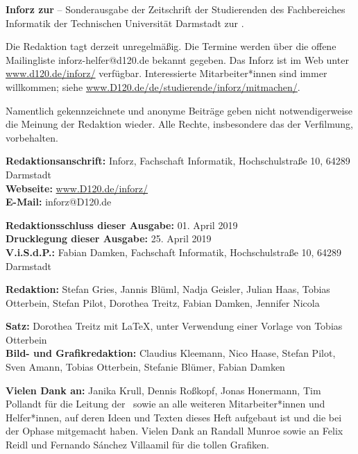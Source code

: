 \small

\textbf{Inforz zur \ophase} – Sonderausgabe der Zeitschrift der Studierenden des Fachbereiches Informatik der Technischen Universität Darmstadt zur \ophase.

\vspace{3mm}
Die Redaktion tagt derzeit unregelmäßig. Die Termine werden über die offene Mailingliste inforz-helfer@d120.de bekannt gegeben. Das Inforz ist im Web unter \url{www.d120.de/inforz/} verfügbar. Interessierte Mitarbeiter*innen sind immer willkommen; siehe \url{www.D120.de/de/studierende/inforz/mitmachen/}.

\vspace{3mm}
Namentlich gekennzeichnete und anonyme Beiträge geben nicht notwendigerweise die Meinung der Redaktion wieder. Alle Rechte, insbesondere das der Verfilmung, vorbehalten.


\textbf{Redaktionsanschrift:} Inforz, Fachschaft Informatik, Hochschulstraße 10, 64289 Darmstadt\\
\textbf{Webseite:} \url{www.D120.de/inforz/}\\
\textbf{E-Mail:} inforz@D120.de

\vspace{3mm}
\textbf{Redaktionsschluss dieser Ausgabe:} 01. April 2019\\
\textbf{Drucklegung dieser Ausgabe:} 25. April 2019\\
\textbf{V.i.S.d.P.:} Fabian Damken, Fachschaft Informatik, Hochschulstraße 10, 64289 Darmstadt

\vspace{3mm}
\textbf{Redaktion:} Stefan Gries, Jannis Blüml, Nadja Geisler, Julian Haas, Tobias Otterbein, Stefan Pilot, Dorothea Treitz, Fabian Damken, Jennifer Nicola

\vspace{3mm}
\textbf{Satz:} Dorothea Treitz mit \LaTeX, unter Verwendung einer Vorlage von Tobias Otterbein\\
\textbf{Bild- und Grafikredaktion:} Claudius Kleemann, Nico Haase, Stefan Pilot, Sven Amann, Tobias Otterbein, Stefanie Blümer, Fabian Damken

\vspace{3mm}
\textbf{Vielen Dank an:} Janika Krull, Dennis Roßkopf, Jonas Honermann, Tim Pollandt für die Leitung der \ophase \  sowie an alle weiteren Mitarbeiter*innen und Helfer*innen, auf deren Ideen und Texten dieses Heft aufgebaut ist und die bei der Ophase mitgemacht haben. Vielen Dank an Randall Munroe sowie an Felix Reidl und Fernando Sánchez Villaamil für die tollen Grafiken.\\

